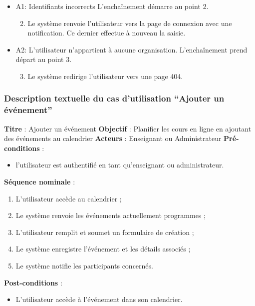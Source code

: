 \begin{itemize}[noitemsep,topsep=0pt]
  \item A1: Identifiants incorrects\newline
    L'enchaînement démarre au point 2.

  \begin{enumerate}[noitemsep,topsep=0pt]
    \setcounter{enumi}{1}
    \item Le système renvoie l’utilisateur vers la page de connexion avec une notification. Ce dernier effectue à nouveau la saisie.
  \end{enumerate}

  \item A2: L’utilisateur n’appartient à aucune organisation.\newline
    L'enchaînement prend départ au point 3.

  \begin{enumerate}[noitemsep,topsep=0pt]
    \setcounter{enumi}{2}
    \item Le système redirige l’utilisateur vers une page 404.
  \end{enumerate}
\end{itemize}


\subsubsection{Description textuelle du cas d’utilisation “Ajouter un événement”}
\textbf{Titre} : Ajouter un événement\newline
\textbf{Objectif} : Planifier les cours en ligne en ajoutant des événements au calendrier\newline
\textbf{Acteurs} : Enseignant ou Administrateur\newline
\textbf{Pré-conditions} : 
\begin{itemize}[noitemsep,topsep=0pt]
  \item l’utilisateur est authentifié en tant qu’enseignant ou administrateur.
\end{itemize}
\textbf{Séquence nominale} :
\begin{enumerate}[noitemsep,topsep=0pt]
  \item L’utilisateur accède au calendrier ;
	\item Le système renvoie les événements actuellement programmes ;
	\item L’utilisateur remplit et soumet un formulaire de création ;
	\item Le système enregistre l'événement et les détails associés ;
	\item Le système notifie les participants concernés.
\end{enumerate}
\textbf{Post-conditions} : 
\begin{itemize}[noitemsep,topsep=0pt]
  \item L’utilisateur accède à l'événement dans son calendrier.
\end{itemize}

